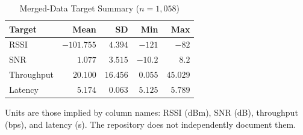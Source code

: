 \begin{table}[t]
\caption{Merged-Data Target Summary ($n=1{,}058$)}
\label{tab:target-summary}
\centering
\footnotesize
\begin{tabular}{lrrrr}
\toprule
Target & Mean & SD & Min & Max\\
\midrule
RSSI & $-101.755$ & $4.394$ & $-121$ & $-82$\\
SNR & $1.077$ & $3.515$ & $-10.2$ & $8.2$\\
Throughput & $20.100$ & $16.456$ & $0.055$ & $45.029$\\
Latency & $5.174$ & $0.063$ & $5.125$ & $5.789$\\
\bottomrule
\end{tabular}
\vspace{1mm}

\raggedright\scriptsize Units are those implied by column names: RSSI (dBm), SNR (dB), throughput (bps), and latency (s). The repository does not independently document them.
\end{table}

